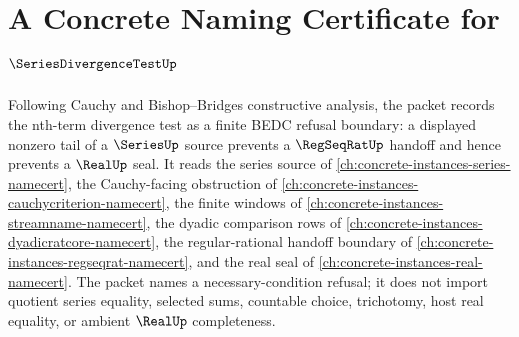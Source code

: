 \chapter{A Concrete Naming Certificate for $\SeriesDivergenceTestUp$}
\label{ch:concrete-instances-series-divergence-test-namecert}

Following Cauchy and Bishop--Bridges constructive analysis, the packet records the nth-term divergence test as a finite BEDC refusal boundary: a displayed nonzero tail of a $\SeriesUp$ source prevents a $\RegSeqRatUp$ handoff and hence prevents a $\RealUp$ seal. It reads the series source of \autoref{ch:concrete-instances-series-namecert}, the Cauchy-facing obstruction of \autoref{ch:concrete-instances-cauchycriterion-namecert}, the finite windows of \autoref{ch:concrete-instances-streamname-namecert}, the dyadic comparison rows of \autoref{ch:concrete-instances-dyadicratcore-namecert}, the regular-rational handoff boundary of \autoref{ch:concrete-instances-regseqrat-namecert}, and the real seal of \autoref{ch:concrete-instances-real-namecert}. The packet names a necessary-condition refusal; it does not import quotient series equality, selected sums, countable choice, trichotomy, host real equality, or ambient $\RealUp$ completeness.

